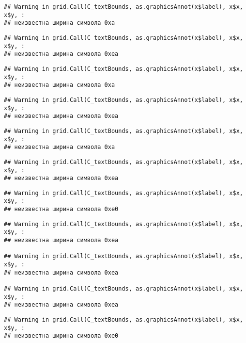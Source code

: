 \documentclass[
]{article}
\begin{document}
\begin{verbatim}
## Warning in grid.Call(C_textBounds, as.graphicsAnnot(x$label), x$x, x$y, :
## неизвестна ширина символа 0xa
\end{verbatim}

\begin{verbatim}
## Warning in grid.Call(C_textBounds, as.graphicsAnnot(x$label), x$x, x$y, :
## неизвестна ширина символа 0xea
\end{verbatim}

\begin{verbatim}
## Warning in grid.Call(C_textBounds, as.graphicsAnnot(x$label), x$x, x$y, :
## неизвестна ширина символа 0xa
\end{verbatim}

\begin{verbatim}
## Warning in grid.Call(C_textBounds, as.graphicsAnnot(x$label), x$x, x$y, :
## неизвестна ширина символа 0xea
\end{verbatim}

\begin{verbatim}
## Warning in grid.Call(C_textBounds, as.graphicsAnnot(x$label), x$x, x$y, :
## неизвестна ширина символа 0xa
\end{verbatim}

\begin{verbatim}
## Warning in grid.Call(C_textBounds, as.graphicsAnnot(x$label), x$x, x$y, :
## неизвестна ширина символа 0xea
\end{verbatim}

\begin{verbatim}
## Warning in grid.Call(C_textBounds, as.graphicsAnnot(x$label), x$x, x$y, :
## неизвестна ширина символа 0xe0
\end{verbatim}

\begin{verbatim}
## Warning in grid.Call(C_textBounds, as.graphicsAnnot(x$label), x$x, x$y, :
## неизвестна ширина символа 0xea

## Warning in grid.Call(C_textBounds, as.graphicsAnnot(x$label), x$x, x$y, :
## неизвестна ширина символа 0xea

## Warning in grid.Call(C_textBounds, as.graphicsAnnot(x$label), x$x, x$y, :
## неизвестна ширина символа 0xea
\end{verbatim}

\begin{verbatim}
## Warning in grid.Call(C_textBounds, as.graphicsAnnot(x$label), x$x, x$y, :
## неизвестна ширина символа 0xe0
\end{verbatim}
\end{document}
